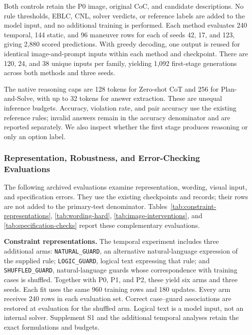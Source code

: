 \documentclass[nolineno]{ieeeaccess}
\begin{document}
Both controls retain the P0 image, original CoC, and candidate descriptions. No rule thresholds, EBLC, CNL, solver verdicts, or reference labels are added to the model input, and no additional training is performed. Each method evaluates 240 temporal, 144 static, and 96 maneuver rows for each of seeds 42, 17, and 123, giving 2,880 scored predictions. With greedy decoding, one output is reused for identical image-and-prompt inputs within each method and checkpoint. There are 120, 24, and 38 unique inputs per family, yielding 1,092 first-stage generations across both methods and three seeds.\par

The native reasoning caps are 128 tokens for Zero-shot CoT and 256 for Plan-and-Solve, with up to 32 tokens for answer extraction. These are unequal inference budgets. Accuracy, violation rate, and pair accuracy use the existing reference rules; invalid answers remain in the accuracy denominator and are reported separately. We also inspect whether the first stage produces reasoning or only an option label.\par
\subsubsection{Representation, Robustness, and Error-Checking Evaluations}\label{sec:additional-evaluations}

The following archived evaluations examine representation, wording, visual input, and specification errors. They use the existing checkpoints and records; their rows are not added to the primary-test denominator. Tables~\ref{tab:constraint-representations}, \ref{tab:wording-hard}, \ref{tab:image-interventions}, and \ref{tab:specification-checks} report these complementary evaluations.\par

\textbf{Constraint representations.} The temporal experiment includes three additional arms: \texttt{NATURAL\_GUARD}, an alternative natural-language expression of the supplied rule; \texttt{LOGIC\_GUARD}, logical text expressing that rule; and \texttt{SHUFFLED\_GUARD}, natural-language guards whose correspondence with training cases is shuffled. Together with P0, P1, and P2, these yield six arms and three seeds. Each fit uses the same 960 training rows and 180 updates. Every arm receives 240 rows in each evaluation set. Correct case--guard associations are restored at evaluation for the shuffled arm. Logical text is a model input, not an internal solver. Supplement S1 and the additional temporal analyses retain the exact formulations and budgets.\par
\end{document}
